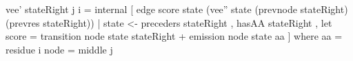 vee' stateRight j i =
  internal [ edge score state (vee'' state (prevnode stateRight)
                                           (prevres  stateRight))
           | state <- preceders stateRight
           , hasAA stateRight
           , let score = transition node state stateRight
                         + emission node state aa
           ]
  where aa   = residue i
        node = middle j
